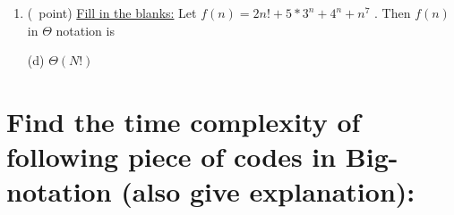 \documentclass[14pt]{article}
\begin{document}
\begin{enumerate}[label=\alph*)]
    \item (\textonequarter\ point) \underline{Fill in the blanks:} Let $f(n) = 2n!+5*3^{n} + 4^{n} + n^7$ . Then $f(n)$ in $\Theta$ notation is \\ \vspace{1em}
    \begin{flushright}
    (d) \underline{\hspace{2cm}$\Theta(N!)$\hspace{2cm}}
    \end{flushright}
\end{enumerate}


\section{Find the time complexity of following piece of codes in Big- notation (also give explanation):}
\end{document}
